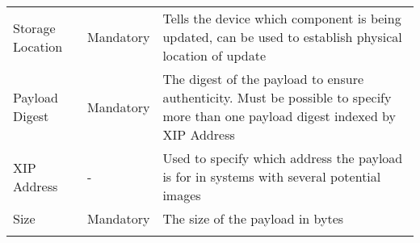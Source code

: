 \documentclass[0-thesis.tex]{subfiles}
\begin{document}
\begin{longtable}[]{@{}lll@{}}
    \begin{minipage}[t]{0.23\columnwidth}\raggedright\strut
    Storage Location\strut
    \end{minipage} & \begin{minipage}[t]{0.26\columnwidth}\raggedright\strut
    Mandatory\strut
    \end{minipage} & \begin{minipage}[t]{0.60\columnwidth}\raggedright\strut
    Tells the device which component is being updated, can be used to
    establish physical location of update\strut
    \end{minipage}\tabularnewline
    \begin{minipage}[t]{0.23\columnwidth}\raggedright\strut
    Payload Digest\strut
    \end{minipage} & \begin{minipage}[t]{0.26\columnwidth}\raggedright\strut
    Mandatory\strut
    \end{minipage} & \begin{minipage}[t]{0.60\columnwidth}\raggedright\strut
    The digest of the payload to ensure authenticity. Must be possible to
    specify more than one payload digest indexed by XIP Address\strut
    \end{minipage}\tabularnewline
    \begin{minipage}[t]{0.23\columnwidth}\raggedright\strut
    XIP Address\strut
    \end{minipage} & \begin{minipage}[t]{0.26\columnwidth}\raggedright\strut
    -\strut
    \end{minipage} & \begin{minipage}[t]{0.60\columnwidth}\raggedright\strut
    Used to specify which address the payload is for in systems with several
    potential images\strut
    \end{minipage}\tabularnewline
    \begin{minipage}[t]{0.23\columnwidth}\raggedright\strut
    Size\strut
    \end{minipage} & \begin{minipage}[t]{0.26\columnwidth}\raggedright\strut
    Mandatory\strut
    \end{minipage} & \begin{minipage}[t]{0.60\columnwidth}\raggedright\strut
    The size of the payload in bytes\strut
    \end{minipage}\tabularnewline
    \begin{minipage}[t]{0.23\columnwidth}\raggedright\strut

\end{minipage}
\end{longtable}
\end{document}
